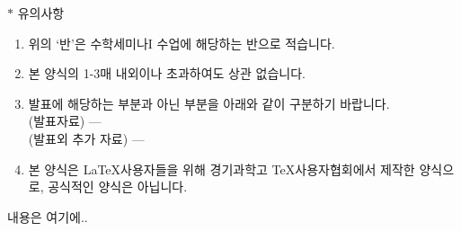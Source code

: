 \documentclass{gshs_math_seminar_report}
\begin{document}
	\makereporttitle
	\indent $ \ast $ 유의사항
	\begin{enumerate}
		\item 위의 `반'은 수학세미나I 수업에 해당하는 반으로 적습니다.
		\item 본 양식의 1-3매 내외이나 초과하여도 상관 없습니다.
		\item 발표에 해당하는 부분과 아닌 부분을 아래와 같이 구분하기 바랍니다. \\
		(발표자료) --- \\
		(발표외 추가 자료) --- 
		\item 본 양식은 \LaTeX 사용자들을 위해 경기과학고 \TeX 사용자협회에서 제작한 양식으로, 공식적인 양식은 아닙니다. 
	\end{enumerate}
	내용은 여기에..
	
	\lipsum[1]
\end{document}
